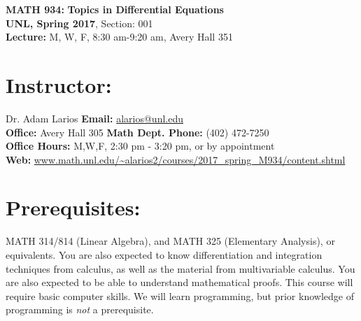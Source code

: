 \documentclass[margin]{res}
\theoremstyle{plain}
\theoremstyle{definition}
\theoremstyle{remark}
\begin{document}
\begin{center}
   \textbf{MATH 934:} 
   \textbf{Topics in Differential Equations}\\
   \textbf{UNL, Spring 2017}, Section: 001%
    \\
   \textbf{Lecture:} M, W, F, 8:30 am-9:20 am, Avery Hall 351\\
\end{center}
%
\vspace{-0.2in}
%
\begin{resume}
\section{Instructor:} Dr. Adam Larios 
\hfill \textbf{Email:} 
\url{alarios@unl.edu}
\\
\textbf{Office:} Avery Hall 305
\hfill
\textbf{Math Dept. Phone:} (402) 472-7250
\\
\textbf{Office Hours:} M,W,F, 2:30 pm - 3:20 pm, or by appointment
\hfill
\\
\textbf{Web:} \url{www.math.unl.edu/~alarios2/courses/2017_spring_M934/content.shtml}



 \section{Prerequisites:} MATH 314/814 (Linear Algebra), and MATH 325 (Elementary Analysis), or equivalents.  You are also expected to know differentiation and integration techniques from calculus, as well as the material from multivariable calculus.   You are also expected to be able to understand mathematical proofs.  This course will require basic computer skills.  We will learn programming, but prior knowledge of programming is \textit{not} a prerequisite.
 
 
 

\end{resume}
\end{document}
